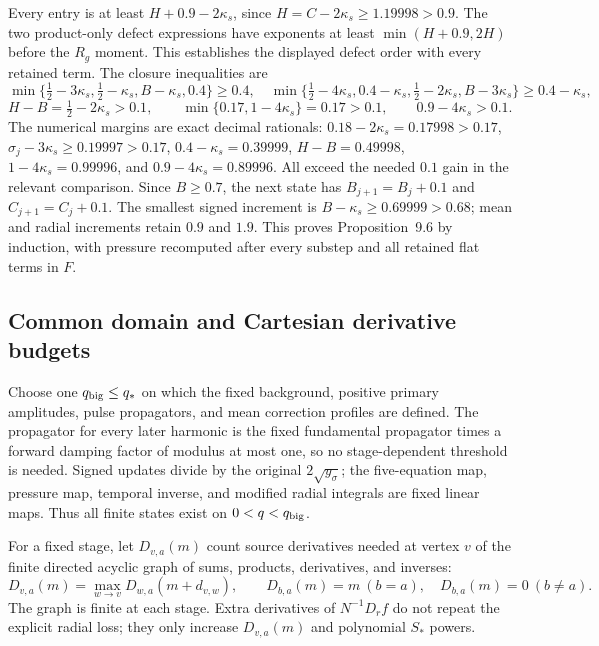 \documentclass[10pt,a4paper]{article}
\begin{document}
Every entry is at least $H+0.9-2\kappa_s$, since
$H=C-2\kappa_s\ge1.19998>0.9$. The two product-only defect expressions
have exponents at least $\min(H+0.9,2H)$ before the $R_g$ moment.
This establishes the displayed defect order with every retained term.
The closure inequalities are
\[
\min\{\tfrac12-3\kappa_s,\tfrac12-\kappa_s,B-\kappa_s,0.4\}\ge0.4,\quad
\min\{\tfrac12-4\kappa_s,0.4-\kappa_s,\tfrac12-2\kappa_s,B-3\kappa_s\}\ge0.4-\kappa_s,
\]
\[
 H-B=\tfrac12-2\kappa_s>0.1,\qquad
 \min\{0.17,1-4\kappa_s\}=0.17>0.1,\qquad 0.9-4\kappa_s>0.1 .
\]
The numerical margins are exact decimal rationals:
$0.18-2\kappa_s=0.17998>0.17$,
$\sigma_j-3\kappa_s\ge0.19997>0.17$,
$0.4-\kappa_s=0.39999$,
$H-B=0.49998$,
$1-4\kappa_s=0.99996$, and $0.9-4\kappa_s=0.89996$.
All exceed the needed $0.1$ gain in the relevant comparison.
Since $B\ge0.7$, the next state has $B_{j+1}=B_j+0.1$ and
$C_{j+1}=C_j+0.1$. The smallest signed increment is
$B-\kappa_s\ge0.69999>0.68$; mean and radial increments retain $0.9$ and
$1.9$. This proves Proposition~9.6 by induction, with pressure recomputed
after every substep and all retained flat terms in $F$.

\subsection{Common domain and Cartesian derivative budgets}
\label{subsec:stage9-domain}

Choose one $q_{\rm big}\le q_*$ on which the fixed background, positive primary
amplitudes, pulse propagators, and mean correction profiles are defined. The
propagator for every later harmonic is the fixed fundamental propagator times a
forward damping factor of modulus at most one, so no stage-dependent threshold
is needed. Signed updates divide by the original $2\sqrt{y_\sigma}$; the
five-equation map, pressure map, temporal inverse, and modified radial integrals
are fixed linear maps. Thus all finite states exist on $0<q<q_{\rm big}$.

For a fixed stage, let $D_{v,a}(m)$ count source derivatives needed at vertex $v$
of the finite directed acyclic graph of sums, products, derivatives, and inverses:
\[
 D_{v,a}(m)=\max_{w\to v}D_{w,a}(m+d_{v,w}),\qquad
 D_{b,a}(m)=m\ (b=a),\quad D_{b,a}(m)=0\ (b\ne a).
\]
The graph is finite at each stage. Extra derivatives of $N^{-1}D_rf$ do not
repeat the explicit radial loss; they only increase $D_{v,a}(m)$ and polynomial
$S_*$ powers.
\end{document}
